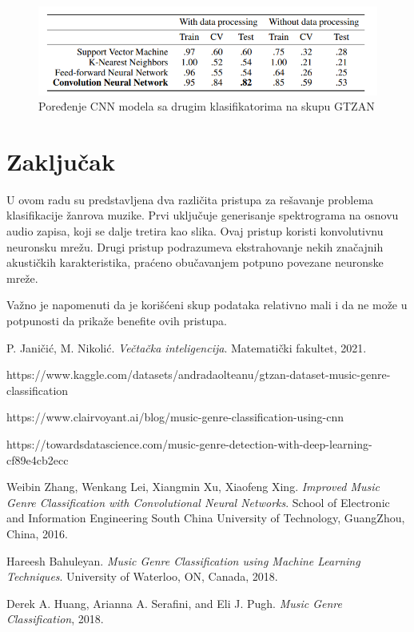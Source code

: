 \documentclass{article}
\begin{document}
\begin{figure}[h]
\centering
\includegraphics[scale=0.8]{cnn-compared}
\caption{Poređenje CNN modela sa drugim klasifikatorima na skupu GTZAN \cite{MGC}}
\end{figure}

\newpage

\section{Zaključak}

U ovom radu su predstavljena dva različita pristupa za rešavanje problema klasifikacije žanrova muzike. Prvi uključuje generisanje spektrograma na osnovu audio zapisa, koji se dalje tretira kao slika. Ovaj pristup koristi konvolutivnu neuronsku mrežu. Drugi pristup podrazumeva ekstrahovanje nekih značajnih akustičkih karakteristika, praćeno obučavanjem potpuno povezane neuronske mreže.

Važno je napomenuti da je korišćeni skup podataka relativno mali i da ne može u potpunosti da prikaže benefite ovih pristupa.

\newpage

\begin{thebibliography}{9}

    P. Janičić, M. Nikolić. \textit{Večtačka inteligencija}. Matematički fakultet, 2021.

	https://www.kaggle.com/datasets/andradaolteanu/gtzan-dataset-music-genre-classification
	
	https://www.clairvoyant.ai/blog/music-genre-classification-using-cnn

	https://towardsdatascience.com/music-genre-detection-with-deep-learning-cf89e4cb2ecc

    \bibitem{}
    Weibin Zhang, Wenkang Lei, Xiangmin Xu, Xiaofeng Xing. \textit{Improved Music Genre Classification with Convolutional Neural Networks}. School of Electronic and Information Engineering
South China University of Technology, GuangZhou, China, 2016.

	Hareesh Bahuleyan. \textit{Music Genre Classification using Machine Learning Techniques}. University of Waterloo, ON, Canada, 2018.
	
	Derek A. Huang, Arianna A. Serafini, and Eli J. Pugh. \textit{Music Genre Classification}, 2018.

	

	

	

\end{thebibliography}
\end{document}
